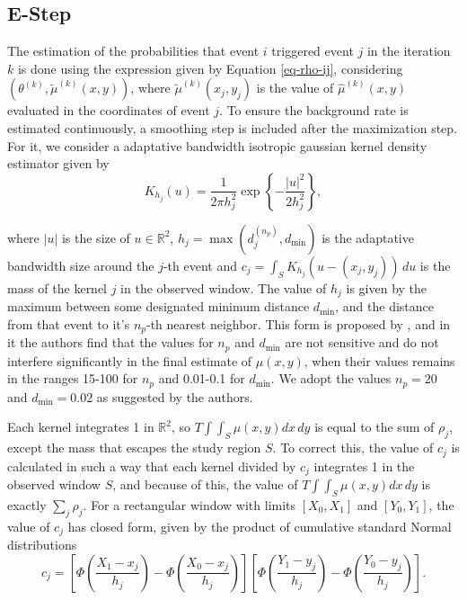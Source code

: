 \subsection{E-Step}
\label{subsec-e-step}

The estimation of the probabilities that event $i$ triggered event $j$ in the iteration $k$ is done using the expression given by Equation \eqref{eq-rho-ij}, considering $(\theta^{(k)},\tilde{\mu}^{(k)}(x,y))$, where $\tilde{\mu}^{(k)}(x_{j},y_{j})$ is the value of $\hat{\mu}^{(k)}(x,y)$ evaluated in the coordinates of event $j$. To ensure the background rate is estimated continuously, a smoothing step is included after the maximization step. For it, we consider a adaptative bandwidth isotropic gaussian kernel density estimator given by
\begin{equation}
  \label{eq-kernel-smoothing}
  K_{h_{j}}(u) = \frac{1}{2\pi h_{j}^{2}}\exp\left\{-\frac{|u|^{2}}{2h_{j}^{2}}\right\},
\end{equation}

\noindent where $|u|$ is the size of $u \in \mathds{R}^{2}$, $h_{j} = \max\left(d_{j}^{(n_{p})}, d_{\text{min}}\right)$ is the adaptative bandwidth size around the $j$-th event and $c_{j} = \int_{S}K_{h_{j}}(u - (x_{j},y_{j}))\, du$ is the mass of the kernel $j$ in the observed window. The value of $h_{j}$ is given by the maximum between some designated minimum distance $d_{\text{min}}$, and the distance from that event to it's $n_{p}$-th nearest neighbor. This form is proposed by , and in it the authors find that the values for $n_{p}$ and $d_{\text{min}}$ are not sensitive and do not interfere significantly in the final estimate of $\mu(x,y)$, when their values remains in the ranges 15-100 for $n_{p}$ and 0.01-0.1 for $d_{\text{min}}$. We adopt the values $n_{p} = 20$ and $d_{\text{min}} = 0.02$ as suggested by the authors.

Each kernel integrates 1 in $\mathds{R}^{2}$, so $T\int\int_{S}\mu(x,y)dx\,dy$ is equal to the sum of $\rho_{j}$, except the mass that escapes the study region $S$. To correct this, the value of $c_{j}$ is calculated in such a way that each kernel divided by $c_{j}$ integrates 1 in the observed window $S$, and because of this, the value of $T \int\int_{S}\mu(x,y)dx\,dy$ is exactly $\sum_{j}\rho_{j}$. For a rectangular window with limits $[X_{0},X_{1}]$ and $[Y_{0},Y_{1}]$, the value of $c_{j}$ has closed form, given by the product of cumulative standard Normal distributions
\begin{equation}
  \label{eq-c-j}
  c_{j} = \left[\Phi\left(\frac{X_{1} - x_{j}}{h_{j}}\right) - \Phi\left(\frac{X_{0} - x_{j}}{h_{j}}\right)\right]\left[\Phi\left(\frac{Y_{1} - y_{j}}{h_{j}}\right) - \Phi\left(\frac{Y_{0} - y_{j}}{h_{j}}\right)\right].
\end{equation}

